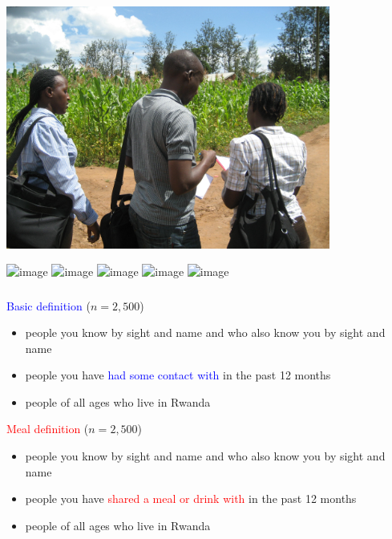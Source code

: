 \documentclass[aspectratio=169]{beamer}
\begin{document}
\begin{frame}

\begin{center}
\includegraphics[width=0.8\textwidth]{figures/rwanda_fieldwork.jpg}
\end{center}

\end{frame}
\begin{frame}

\begin{center}
\includegraphics<1>[width=0.7\textwidth]{figures/tie_strength_axes}
\includegraphics<2>[width=0.7\textwidth]{figures/tie_strength_sampling}
\includegraphics<3>[width=0.7\textwidth]{figures/tie_strength_sampling_non_sampling}
\includegraphics<4>[width=0.7\textwidth]{figures/tie_strength_sampling_non_sampling_total}
\includegraphics<5>[width=0.7\textwidth]{figures/tie_strength_total}
\end{center}


\end{frame}
\begin{frame}
\frametitle{}

{\Large
\begin{center}
\textcolor{blue}{Basic definition} ($n=2,500$)
\end{center}
}
\begin{itemize}
\item people you know by sight and name and who also know you by sight and name  
\item people you have \textcolor{blue}{had some contact with} in the past 12 months
\item people of all ages who live in Rwanda
\end{itemize}

{\Large
\begin{center}
\textcolor{red}{Meal definition} ($n=2,500$)
\end{center}
}
\begin{itemize}
\item people you know by sight and name and who also know you by sight and name  
\item people you have \textcolor{red}{shared a meal or drink with} in the past 12 months
\item people of all ages who live in Rwanda
\end{itemize}

\end{frame}
\end{document}
